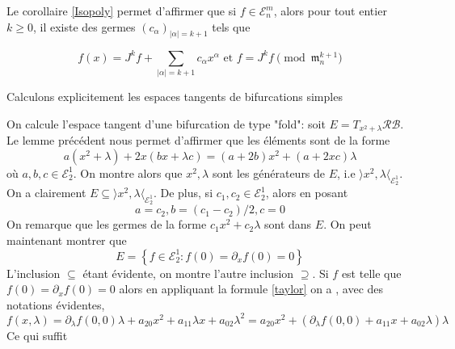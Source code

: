 \documentclass[memoire.tex]{subfiles}
\begin{document}
Le corollaire \ref{Isopoly} permet d'affirmer que si $f\in\mathcal{E}_n^m$, alors pour tout entier $k\geq 0$, il existe des germes $(c_{\alpha})_{|\alpha|=k+1}$ tels que

\begin{equation}\label{taylor}
    f(x)=J^kf +\sum_{|\alpha|=k+1}c_{\alpha}x^
    {\alpha}\text{ et } f = J^kf\pmod {\mathfrak{m}_n^{k+1}}
\end{equation}

Calculons explicitement les espaces tangents de bifurcations simples

\begin{exemple}
    On calcule l'espace tangent d'une 
    bifurcation de type "fold": soit $E=T_{x^2
    +\lambda}\mathcal{RB}$. Le lemme précédent 
    nous permet d'affirmer que les éléments 
    sont de la forme
    \begin{equation*}
        a(x^2+\lambda)+2x(bx+\lambda c)=(a+2b)x^2 + (a+2xc)\lambda
    \end{equation*}
    où $a,b,c\in\mathcal{E}_2^1$.
    On montre alors que $x^2,\lambda$ sont les générateurs de $E$, i.e $\rangle x^2,\lambda\langle_{\mathcal{E}_2^1}$. On a clairement $E\subseteq \rangle x^2,\lambda\langle_{\mathcal{E}_2^1} $. De plus, si $c_1,c_2\in\mathcal{E}_2^1$, alors en posant
    \begin{equation*}
        a=c_2, b=(c_1-c_2)/2, c=0
    \end{equation*}
    On remarque que les germes de la forme $c_1 x^2+c_2\lambda$ sont dans $E$.
    On peut maintenant montrer que
    \begin{equation}\label{FORME-COOL}
        E=\left\{f\in\mathcal{E}_2^1: f(0)=\partial_x f(0)=0\right\}
    \end{equation}
    L'inclusion $\subseteq$ étant évidente, on montre l'autre inclusion $\supseteq$. Si $f$ est telle que $f(0)=\partial_x f(0)=0$ alors en appliquant la formule \ref{taylor}  on a , avec des notations évidentes,
    \begin{equation*}
        f(x,\lambda)=\partial_\lambda f(0,0)\lambda +a_{20}x^2+a_{11}\lambda x+a_{02}\lambda^2= a_{20}x^2+(\partial_\lambda f(0,0)+a_{11}x+a_{02}\lambda)\lambda
    \end{equation*}
    Ce qui suffit
\end{exemple}
\end{document}
